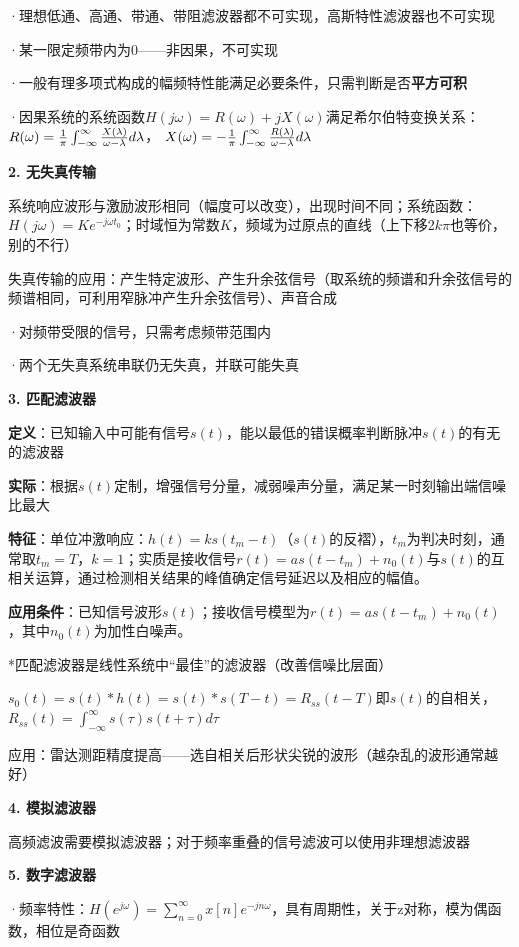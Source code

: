 ·理想低通、高通、带通、带阻滤波器都不可实现，高斯特性滤波器也不可实现

·某一限定频带内为0——非因果，不可实现

·一般有理多项式构成的幅频特性能满足必要条件，只需判断是否\textbf{平方可积}

·因果系统的系统函数$H(j\omega)=R(\omega)+jX(\omega)$满足希尔伯特变换关系：$R(\omega)={1\over\pi}\int_{-\infty}^{\infty}{{X(\lambda)}\over{\omega-\lambda}}d\lambda$， $X(\omega)=-{1\over\pi}\int_{-\infty}^{\infty}{{R(\lambda)}\over{\omega-\lambda}}d\lambda$

\textbf{2. 无失真传输}
   
系统响应波形与激励波形相同（幅度可以改变），出现时间不同；系统函数：$H(j\omega)=Ke^{-j{\omega}t_0}$；时域恒为常数$K$，频域为过原点的直线（上下移2$k\pi$也等价，别的不行）

失真传输的应用：产生特定波形、产生升余弦信号（取系统的频谱和升余弦信号的频谱相同，可利用窄脉冲产生升余弦信号）、声音合成

·对频带受限的信号，只需考虑频带范围内

·两个无失真系统串联仍无失真，并联可能失真

\textbf{3. 匹配滤波器}

\textbf{定义}：已知输入中可能有信号$s(t)$，能以最低的错误概率判断脉冲$s(t)$的有无的滤波器

\textbf{实际}：根据$s(t)$定制，增强信号分量，减弱噪声分量，满足某一时刻输出端信噪比最大

\textbf{特征}：单位冲激响应：$h(t)=ks(t_m-t)$（$s(t)$的反褶），$t_m$为判决时刻，通常取$t_m=T$，$k=1$；实质是接收信号$r(t)=a s(t-t_m)+n_0(t)$与$s(t)$的互相关运算，通过检测相关结果的峰值确定信号延迟以及相应的幅值。

\textbf{应用条件}：已知信号波形$s(t)$；接收信号模型为$r(t)=a s(t-t_m)+n_0(t)$，其中$n_0(t)$为加性白噪声。

*匹配滤波器是线性系统中“最佳”的滤波器（改善信噪比层面）

$s_0(t)=s(t)*h(t)=s(t)*s(T-t)=R_{ss}(t-T)$即$s(t)$的自相关，$R_{ss}(t)=\int_{-\infty}^{\infty}s(\tau)s(t+\tau)d\tau$

应用：雷达测距精度提高——选自相关后形状尖锐的波形（越杂乱的波形通常越好）


\textbf{4. 模拟滤波器}

高频滤波需要模拟滤波器；对于频率重叠的信号滤波可以使用非理想滤波器

\textbf{5. 数字滤波器}
   
·频率特性：$H(e^{j\omega})={\sum_{n=0}^\infty}x[n]e^{-jn\omega}$，具有周期性，关于z对称，模为偶函数，相位是奇函数


